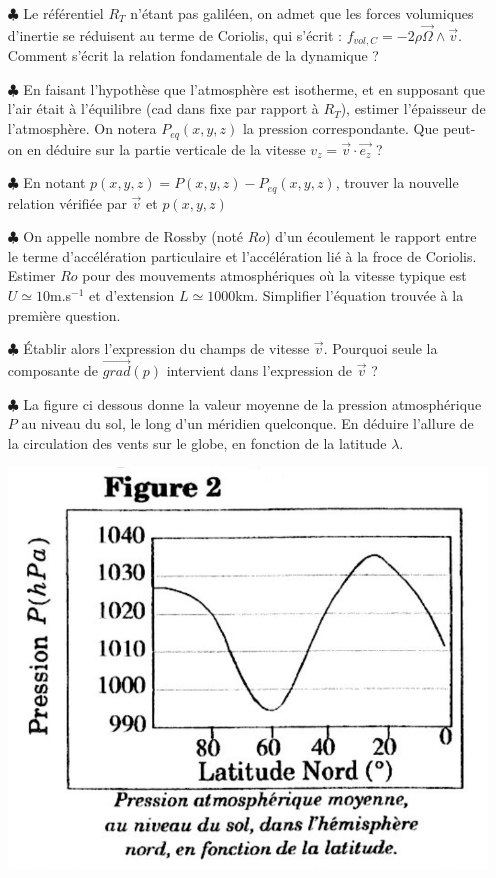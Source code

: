 \documentclass{report}
\begin{document}
\begin{itemize}

	\item[$\clubsuit$] Le référentiel $R_T$ n'étant pas galiléen, on admet que les forces volumiques d'inertie se réduisent au terme de Coriolis, qui s'écrit : $f_{vol, C}=-2\rho\vec{\Omega}\wedge\vec{v}$. Comment s'écrit la relation fondamentale de la dynamique ?
	
	\item[$\clubsuit$] En faisant l'hypothèse que l'atmosphère est isotherme, et en supposant que l'air était à l'équilibre (cad dans fixe par rapport à $R_T$), estimer l'épaisseur de l'atmosphère. On notera $P_{eq}(x,y,z)$ la pression correspondante. Que peut-on en déduire sur la partie verticale de la vitesse $v_z=\vec{v}\cdot\vec{e_z}$ ?
	
	\item[$\clubsuit$] En notant $p(x,y,z)=P(x,y,z)-P_{eq}(x,y,z)$, trouver la nouvelle relation vérifiée par $\vec{v}$ et $p(x,y,z)$
	
	\item[$\clubsuit$] On appelle nombre de Rossby (noté $Ro$) d'un écoulement le rapport entre le terme d'accélération particulaire et l'accélération lié à la froce de Coriolis. Estimer $Ro$ pour des mouvements atmosphériques où la vitesse typique est $U\simeq10$m.s$^{-1}$ et d'extension $L\simeq1000$km. Simplifier l'équation trouvée à la première question.
	
	\item[$\clubsuit$] Établir alors l'expression du champs de vitesse $\vec{v}$. Pourquoi seule la composante de $\vec{grad}(p)$ intervient dans l'expression de $\vec{v}$ ?
	
	\item[$\clubsuit$] La figure ci dessous donne la valeur moyenne de la pression atmosphérique $P$ au niveau du sol, le long d'un méridien quelconque. En déduire l'allure de la circulation des vents sur le globe, en fonction de la latitude $\lambda$.
	
\begin{center}
	\includegraphics[scale=0.3]{meca_flu5bis.png}
\end{center}	
	

\end{itemize}
\end{document}
